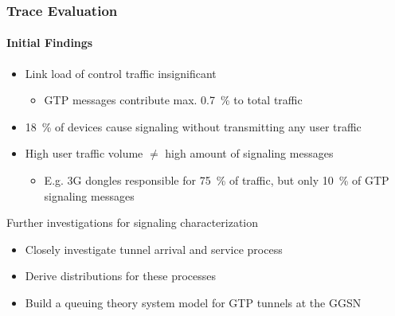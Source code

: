 \documentclass{beamer}
\begin{document}
\begin{frame}
	\frametitle{Trace Evaluation}
	\framesubtitle{Initial Findings}

	\begin{itemize}
		\item Link load of control traffic insignificant
			\begin{itemize}
				\item GTP messages contribute max. \SI{0.7}{\percent} to total traffic
			\end{itemize}
		\item \SI{18}{\percent} of devices cause signaling without transmitting any user traffic
		\item High user traffic volume $\neq$  high amount of signaling messages
			\begin{itemize}
				\item E.g. 3G dongles responsible for \SI{75}{\percent} of traffic, but only \SI{10}{\percent} of GTP signaling messages
			\end{itemize}
	\end{itemize}
	\pause
	\begin{block}{Further investigations for signaling characterization}
	\begin{itemize}
		\item Closely investigate tunnel arrival and service process
		\item Derive distributions for these processes
		\item Build a queuing theory system model for GTP tunnels at the GGSN
	\end{itemize}
	\end{block}
\end{frame}
\end{document}
